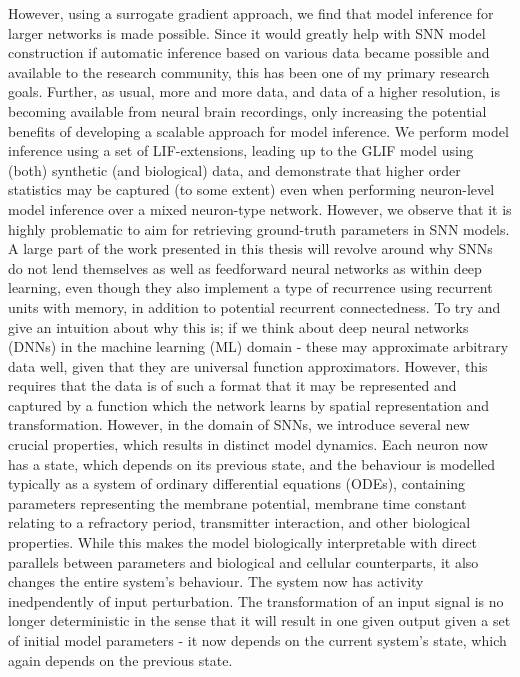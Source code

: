 \documentclass[mphil,deptreport,ai]{infthesis} %
\begin{document}
However, using a surrogate gradient approach, we find that model inference for larger networks is made possible. 
Since it would greatly help with SNN model construction if automatic inference based on various data became possible and available to the research community, this has been one of my primary research goals.
Further, as usual, more and more data, and data of a higher resolution, is becoming available from neural brain recordings, only increasing the potential benefits of developing a scalable approach for model inference.
We perform model inference using a set of LIF-extensions, leading up to the GLIF model using (both) synthetic (and biological) data, and demonstrate that higher order statistics may be captured (to some extent) even when performing neuron-level model inference over a mixed neuron-type network.
However, we observe that it is highly problematic to aim for retrieving ground-truth parameters in SNN models. A large part of the work presented in this thesis will revolve around why SNNs do not lend themselves as well as feedforward neural networks as within deep learning, even though they also implement a type of recurrence using recurrent units with memory, in addition to potential recurrent connectedness.
To try and give an intuition about why this is; if we think about deep neural networks (DNNs) in the machine learning (ML) domain - these may approximate arbitrary data well, given that they are universal function approximators. However, this requires that the data is of such a format that it may be represented and captured by a function which the network learns by spatial representation and transformation.
However, in the domain of SNNs, we introduce several new crucial properties, which results in distinct model dynamics. Each neuron now has a state, which depends on its previous state, and the behaviour is modelled typically as a system of ordinary differential equations (ODEs), containing parameters representing the membrane potential, membrane time constant relating to a refractory period, transmitter interaction, and other biological properties. 
While this makes the model biologically interpretable with direct parallels between parameters and biological and cellular counterparts, it also changes the entire system's behaviour.
The system now has activity inedpendently of input perturbation. The transformation of an input signal is no longer deterministic in the sense that it will result in one given output given a set of initial model parameters - it now depends on the current system's state, which again depends on the previous state.
\end{document}
